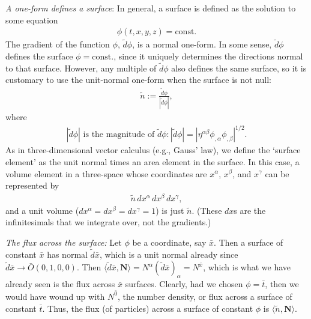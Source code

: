\documentclass[11pt,letterpaper]{book}
\begin{document}
    \textit{A one-form defines a surface}: 
    In general, a surface is defined as the solution to some equation
    \begin{align}
    \phi(t, x, y, z) = \text{const.}
    \end{align}
    The gradient of the function \(\phi\), \(\tilde{d}\phi\), is a normal one-form. In some sense, \(\tilde{d}\phi\) defines the surface \(\phi = \text{const.}\), since it uniquely determines the directions normal to that surface. However, any multiple of \(\tilde{d}\phi\) also defines the same surface, so it is customary to use the unit-normal one-form when the surface is not null:
    \begin{align}
    \tilde{n} := \frac{\tilde{d}\phi}{|\tilde{d}\phi|}, \tag{4.7}
    \end{align}
    where
    \begin{align}
    |\tilde{d}\phi| \text{ is the magnitude of } \tilde{d}\phi : |\tilde{d}\phi| = \left|\eta^{\alpha\beta} \phi_{,\alpha} \phi_{,\beta}\right|^{1/2}. \tag{4.8}
    \end{align}
    As in three-dimensional vector calculus (e.g., Gauss’ law), we define the ‘surface element’ as the unit normal times an area element in the surface. In this case, a volume element in a three-space whose coordinates are \(x^\alpha\), \(x^\beta\), and \(x^\gamma\) can be represented by
    \begin{align}
    \tilde{n} \, dx^\alpha \, dx^\beta \, dx^\gamma, \tag{4.9}
    \end{align}
    and a unit volume (\(dx^\alpha = dx^\beta = dx^\gamma = 1\)) is just \(\tilde{n}\). (These \(dx\)s are the infinitesimals that we integrate over, not the gradients.)

    \textit{The flux across the surface:} 
    Let \(\phi\) be a coordinate, say \(\bar{x}\). Then a surface of constant \(\bar{x}\) has normal \(\tilde{d} \bar{x}\), which is a unit normal already since \(\tilde{d} \bar{x} \rightarrow \bar{O} (0, 1, 0, 0)\). Then \(\langle \tilde{d} \bar{x}, \mathbf{N} \rangle = N^\alpha (\tilde{d} \bar{x})_\alpha = N^{\bar{x}}\), which is what we have already seen is the flux across \(\bar{x}\) surfaces. Clearly, had we chosen \(\phi = \bar{t}\), then we would have wound up with \(N^{\bar{0}}\), the number density, or flux across a surface of constant \(\bar{t}\). Thus, the flux (of particles) across a surface of constant \(\phi\) is \(\langle \tilde{n}, \mathbf{N} \rangle\).
\end{document}
